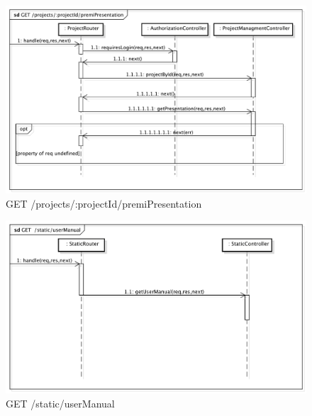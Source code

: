 \begin{center}
\begin{figure}[h]
\centering
\includegraphics[scale=0.35,keepaspectratio]{diagrammi/sequenza/BackEnd/getPremi.pdf}
\caption{GET  /projects/:projectId/premiPresentation}
\end{figure}
\FloatBarrier
\end{center}
\label{getStat}
\begin{center}
\begin{figure}[h]
\centering
\includegraphics[scale=0.35,keepaspectratio]{diagrammi/sequenza/BackEnd/getStat.pdf}
\caption{GET  /static/userManual}
\end{figure}
\FloatBarrier
\end{center}
